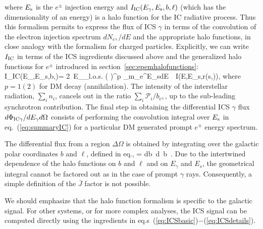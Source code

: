 \label{eq:summaryIC}
\eeq
where $E_{\rm s}$ is the $e^\pm$ injection energy and $I_{\rm IC}(E_\gamma,E_{\rm s},b,\ell)$ (which has the dimensionality of an energy) is a halo function for the IC radiative process. 
Thus this formalism permits to express the flux of ICS $\gamma$ in terms of the convolution of the electron injection spectrum $dN_{e^\pm}/dE$ and the appropriate halo functions, in close analogy with the formalism for charged particles.
Explicitly, we can write $I_{\rm IC}$ in terms of the ICS ingredients discussed above and the generalized halo functions for $e^\pm$  introduced in section~\ref{sec:epemhalofunctions}:
\beq\label{HaloICS}
I_{\rm IC}(E_\gamma,E_{\rm s},b,\ell)= 2\, E_\gamma \int_{\rm l.o.s.}  \left(  \right)^p \hspace{-0.2cm} \int_{m_e}^{E_{\rm s}}\hspace{-0.3cm}dE\,  \,  I(E,E_{\rm s},r(s,\theta)),
\eeq
where $p=1 (2)$  for DM decay (annihilation). 
The intensity of the interstellar radiation, $\sum_i n_i$, cancels out in the ratio  $\sum_i \mathcal{P}_i/b_{e^\pm}$, up to the sub-leading synchrotron contribution.
The final step in obtaining the differential ICS $\gamma$ flux $d\Phi_{\rm IC \gamma}/dE_\gamma d\Omega$ consists of performing the convolution integral over $E_{\rm s}$ in eq.~(\ref{eq:summaryIC}) for a particular DM generated prompt $e^\pm$ energy spectrum.  

The differential flux from a region $\Delta \Omega$ is obtained by integrating over the galactic polar coordinates
$b$ and $\ell$, defined in eq., 
\beq
{} = \iint db\, d\ell\, \cos b\, .
\label{eq:summaryICI}
\eeq
Due to the intertwined dependence of the halo functions on $b$ and $\ell$ and on $E_\gamma$ and $E_s$, the geometrical integral cannot be factored out as in the case of prompt $\gamma$ rays. 
Consequently, a simple definition of the $\bar J$  factor is not possible.



\medskip

We should emphasize that the halo function formalism is specific to the galactic signal. 
For other systems, or for more complex analyses,  the ICS signal can be computed directly using the ingredients in eq.s~(\ref{eq:ICSbasic})$-$(\ref{eq:ICSdetails}).



